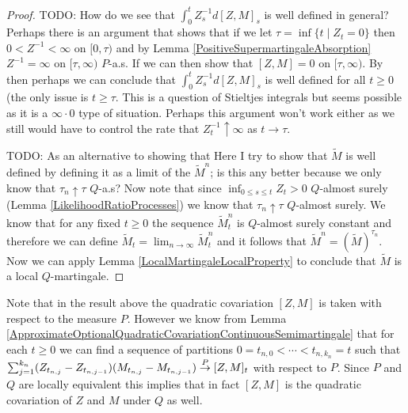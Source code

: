 \begin{proof}
TODO: How do we see that $\int_0^t Z^{-1}_s  d[Z,M]_s$ is well defined in general?  Perhaps there is an argument that shows that if we let $\tau = \inf \lbrace t \mid Z_t = 0 \rbrace$ then $0 < Z^{-1} < \infty$ on $[0,\tau)$ and  by  Lemma \ref{PositiveSupermartingaleAbsorption}  $Z^{-1} = \infty$ on $[\tau, \infty)$ $P$-a.s.  If we can then show that $[Z,M]=0$ on $[\tau,\infty)$.  By  then perhaps we can conclude that $\int_0^t Z^{-1}_s d[Z,M]_s$ is well defined for all $t \geq 0$ (the only issue is $t \geq \tau$.  This is a question of Stieltjes integrals but seems possible as it is a $\infty \cdot 0$ type of situation.  Perhaps this argument won't work either as we still would have to control the rate that $Z^{-1}_t \uparrow \infty$ as $t \to \tau$.

TODO: As an alternative to showing that Here I try to show that $\tilde{M}$ is well defined by defining it as a limit of the $\tilde{M}^n$; is this any better because we only know that $\tau_n \uparrow \tau$ $Q$-a.s?  Now note that since $\inf_{0 \leq s \leq t} Z_t > 0$ $Q$-almost surely (Lemma \ref{LikelihoodRatioProcesses}) we know that $\tau_n \uparrow \tau$ $Q$-almost surely.  We know that for any fixed $t \geq 0$ the sequence $\tilde{M}^n_t$ is $Q$-almost surely constant and therefore we can define $\tilde{M}_t = \lim_{n \to \infty} \tilde{M}^n_t$ and it follows that $\tilde{M}^n = (\tilde{M})^{\tau_n}$.  Now we can apply Lemma \ref{LocalMartingaleLocalProperty} to conclude that $\tilde{M}$ is a local $Q$-martingale.
\end{proof}

Note that in the result above the quadratic covariation $[Z,M]$ is taken with respect to the measure $P$.  However we know from Lemma \ref{ApproximateOptionalQuadraticCovariationContinuousSemimartingale} that for each $t \geq 0$ we can find a sequence of partitions $0=t_{n,0} < \dotsb < t_{n,k_n} = t$ such that $\sum_{j=1}^{k_n} (Z_{t_{n, j}} - Z_{t_{n, j-1}})  (M_{t_{n, j}} - M_{t_{n, j-1}}) \overset{P}\to [Z,M]_t$ with respect to $P$.  Since $P$ and $Q$ are locally equivalent this implies that in fact $[Z,M]$ is the quadratic covariation of $Z$ and $M$ under $Q$ as well.

